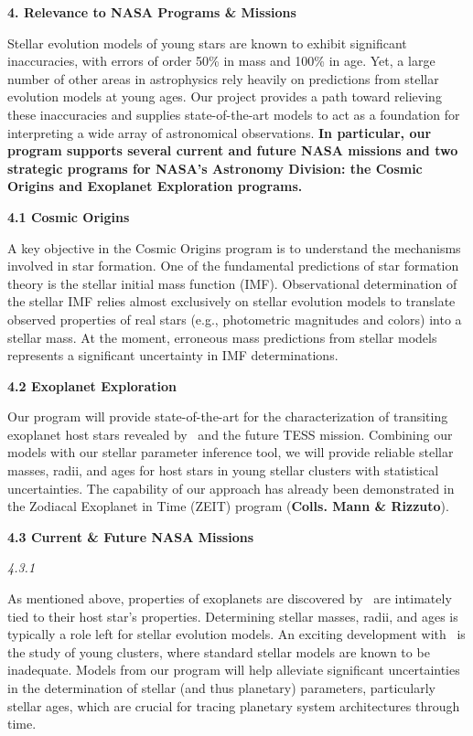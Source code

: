 {\bf\large 4. Relevance to NASA Programs \& Missions}  

Stellar evolution models of young stars are known to exhibit significant inaccuracies, with errors of order 50\% in mass and 100\% in age. Yet, a large number of other areas in astrophysics rely heavily on predictions from stellar evolution models at young ages. Our project provides a path toward relieving these inaccuracies and supplies state-of-the-art models to act as a foundation for interpreting a wide array of astronomical observations. {\bf In particular, our program supports several current and future NASA missions and two strategic programs for NASA's Astronomy Division: the Cosmic Origins and Exoplanet Exploration programs.}

{\bf 4.1 Cosmic Origins}

A key objective in the Cosmic Origins program is to understand the mechanisms involved in star formation. One of the fundamental predictions of star formation theory is the stellar initial mass function (IMF). Observational determination of the stellar IMF relies almost exclusively on stellar evolution models to translate observed properties of real stars (e.g., photometric magnitudes and colors) into a stellar mass. At the moment, erroneous mass predictions from stellar models represents a significant uncertainty in IMF determinations. 

{\bf 4.2 Exoplanet Exploration}

Our program will provide state-of-the-art for the characterization of transiting exoplanet host stars revealed by \kepler\ and the future TESS mission. Combining our models with our stellar parameter inference tool, we will provide reliable stellar masses, radii, and ages for host stars in young stellar clusters with statistical uncertainties. The capability of our approach has already been demonstrated in the Zodiacal Exoplanet in Time (ZEIT) program ({\bf Colls. Mann \& Rizzuto}). 

{\bf 4.3 Current \& Future NASA Missions}

{\it 4.3.1 \kepler}

As mentioned above, properties of exoplanets are discovered by \kepler\ are intimately tied to their host star's properties. Determining stellar masses, radii, and ages is typically a role left for stellar evolution models. An exciting development with \kepler\ is the study of young clusters, where standard stellar models are known to be inadequate. Models from our program will help alleviate significant uncertainties in the determination of stellar (and thus planetary) parameters, particularly stellar ages, which are crucial for tracing planetary system architectures through time.

